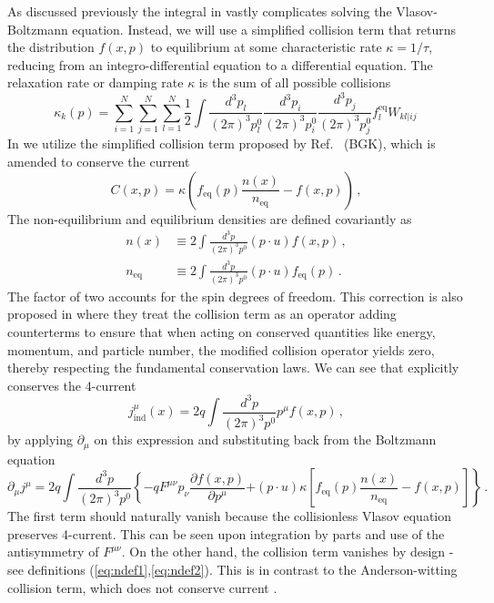 As discussed previously the integral in  vastly complicates solving the Vlasov-Boltzmann equation. Instead, we will use a simplified collision term that returns the distribution $f(x,p)$ to equilibrium at some characteristic rate $\kappa = 1/\tau$, reducing  from an integro-differential equation to a differential equation. The relaxation rate or damping rate $\kappa$ is the sum of all possible collisions~\cite{Das:2021bkz}
\begin{equation}
    \kappa_k(p) = \sum^N_{i=1}\sum^N_{j=1}\sum^N_{l=1} \frac{1}{2}\int\frac{d^3p_l}{(2 \pi)^3p_l^0}\frac{d^3p_i}{(2 \pi)^3p_i^0}\frac{d^3p_j}{(2 \pi)^3p_j^0}f_l^{\text{eq}}W_{kl|ij}\,
\end{equation}
In \cite{Formanek:2021blc} we utilize the simplified collision term proposed by Ref.~\cite{Bhatnagar:1954zz} (BGK), which is amended to conserve the current 
\begin{equation}\label{eq:collision}
    \boxed{C(x,p) =\kappa\left(f_{\text{eq}}(p)\frac{n(x)}{{n_{\text{eq}}}} - f(x,p)\right)}\,,
\end{equation}
The non-equilibrium and equilibrium densities are defined covariantly as
\begin{align}
\label{eq:ndef1}n(x) &\equiv 2 \int \frac{d^3p}{(2\pi)^3p^0}(p \cdot u)f(x,p)\,,\\
\label{eq:ndef2}n_\mathrm{eq} &\equiv 2\int \frac{d^3p}{(2\pi)^3p^0}(p \cdot u) f_\mathrm{eq}(p)\,.
\end{align}
The factor of two accounts for the spin degrees of freedom. This correction is also proposed in \cite{Rocha:2021zcw} where they treat the collision term as an operator adding counterterms to ensure that when acting on conserved quantities like energy, momentum, and particle number, the modified collision operator yields zero, thereby respecting the fundamental conservation laws. We can see that  explicitly conserves the 4-current~\cite{Formanek:2021blc}
\begin{equation}\label{eq:jmudef}
j_{\mathrm{ind}}^\mu (x)= 2q \int \frac{d^3p}{(2\pi)^3p^0}p^\mu f(x,p)\,,
\end{equation}
by applying $\partial_\mu$ on this expression and substituting back from the Boltzmann equation 
\begin{equation}
\partial_\mu j^\mu = 2q \int \frac{d^3p}{(2\pi)^3p^0} \left\{-q F^{\mu\nu}p_\nu \frac{\partial f(x,p)}{\partial p^\mu}\right. 
\left. + (p \cdot u)\kappa \left[f_\mathrm{eq}(p) \frac{n(x)}{n_\mathrm{eq}}-f(x,p) \right] \right\}\,.
\end{equation} 
The first term should naturally vanish because the collisionless Vlasov equation preserves 4-current. This can be seen upon integration by parts and use of the antisymmetry of $F^{\mu\nu}$. On the other hand, the collision term vanishes by design - see definitions (\ref{eq:ndef1},\ref{eq:ndef2}). This is in contrast to the Anderson-witting collision term, which does not conserve current .


